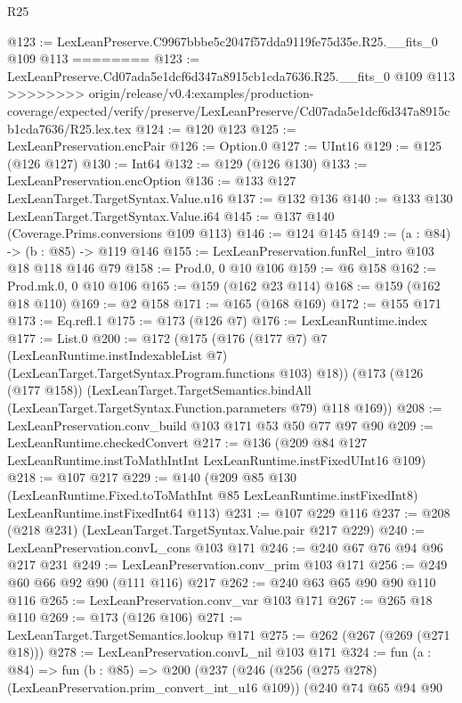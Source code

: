 \begin{lexlean}{R25}
\begin{coremodule}
{{{{{@123 := LexLeanPreserve.C9967bbbe5c2047f57dda9119fe75d35e.R25.__fits_0 @109 @113
========
@123 := LexLeanPreserve.Cd07ada5e1dcf6d347a8915cb1cda7636.R25.__fits_0 @109 @113
>>>>>>>> origin/release/v0.4:examples/production-coverage/expected/verify/preserve/LexLeanPreserve/Cd07ada5e1dcf6d347a8915cb1cda7636/R25.lex.tex
@124 := @120 @123
@125 := LexLeanPreservation.encPair
@126 := Option.{0}
@127 := UInt16
@129 := @125 (@126 @127)
@130 := Int64
@132 := @129 (@126 @130)
@133 := LexLeanPreservation.encOption
@136 := @133 @127 LexLeanTarget.TargetSyntax.Value.u16
@137 := @132 @136
@140 := @133 @130 LexLeanTarget.TargetSyntax.Value.i64
@145 := @137 @140 (Coverage.Prims.conversions @109 @113)
@146 := @124 @145
@149 := (a : @84) -> (b : @85) -> @119 @146
@155 := LexLeanPreservation.funRel_intro @103 @18 @118 @146 @79
@158 := Prod.{0, 0} @10 @106
@159 := @6 @158
@162 := Prod.mk.{0, 0} @10 @106
@165 := @159 (@162 @23 @114)
@168 := @159 (@162 @18 @110)
@169 := @2 @158
@171 := @165 (@168 @169)
@172 := @155 @171
@173 := Eq.refl.{1}
@175 := @173 (@126 @7)
@176 := LexLeanRuntime.index
@177 := List.{0}
@200 := @172
    (@175
      (@176
        (@177 @7)
        @7
        (LexLeanRuntime.instIndexableList @7)
        (LexLeanTarget.TargetSyntax.Program.functions @103)
        @18))
    (@173
      (@126 (@177 @158))
      (LexLeanTarget.TargetSemantics.bindAll
        (LexLeanTarget.TargetSyntax.Function.parameters @79)
        @118
        @169))
@208 := LexLeanPreservation.conv_build @103 @171 @53 @50 @77 @97 @90
@209 := LexLeanRuntime.checkedConvert
@217 := @136 (@209 @84 @127 LexLeanRuntime.instToMathIntInt LexLeanRuntime.instFixedUInt16 @109)
@218 := @107 @217
@229 := @140
    (@209
      @85
      @130
      (LexLeanRuntime.Fixed.toToMathInt @85 LexLeanRuntime.instFixedInt8)
      LexLeanRuntime.instFixedInt64
      @113)
@231 := @107 @229 @116
@237 := @208 (@218 @231) (LexLeanTarget.TargetSyntax.Value.pair @217 @229)
@240 := LexLeanPreservation.convL_cons @103 @171
@246 := @240 @67 @76 @94 @96 @217 @231
@249 := LexLeanPreservation.conv_prim @103 @171
@256 := @249 @60 @66 @92 @90 (@111 @116) @217
@262 := @240 @63 @65 @90 @90 @110 @116
@265 := LexLeanPreservation.conv_var @103 @171
@267 := @265 @18 @110
@269 := @173 (@126 @106)
@271 := LexLeanTarget.TargetSemantics.lookup @171
@275 := @262 (@267 (@269 (@271 @18)))
@278 := LexLeanPreservation.convL_nil @103 @171
@324 := fun (a : @84) =>
  fun (b : @85) =>
  @200
    (@237
      (@246
        (@256 (@275 @278) (LexLeanPreservation.prim_convert_int_u16 @109))
        (@240
          @74
          @65
          @94
          @90
}}}}}
\end{coremodule}
\end{lexlean}
